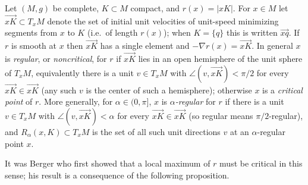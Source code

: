 \begin{definition}
  \label{def:pet-ch12-alpha-regular}
  Let $(M,g)$ be complete, $K\subset M$ compact, and $r(x)=|xK|$. For
  $x\in M$ let $\overrightarrow{xK}\subset T_xM$ denote the set of initial
  unit velocities of unit-speed minimizing segments from $x$ to $K$ (i.e.\ of
  length $r(x)$); when $K=\{q\}$ this is written $\overrightarrow{xq}$. If $r$
  is smooth at $x$ then $\overrightarrow{xK}$ has a single element and
  $-\nabla r(x)=\overrightarrow{xK}$. In general $x$ is \emph{regular}, or
  \emph{noncritical}, for $r$ if $\overrightarrow{xK}$ lies in an open
  hemisphere of the unit sphere of $T_xM$, equivalently there is a unit
  $v\in T_xM$ with $\angle(v,\overrightarrow{xK})<\pi/2$ for every
  $\overrightarrow{xK}\in\overrightarrow{xK}$ (any such $v$ is the center of
  such a hemisphere); otherwise $x$ is a \emph{critical point} of $r$. More
  generally, for $\alpha\in(0,\pi]$, $x$ is \emph{$\alpha$-regular} for $r$ if
  there is a unit $v\in T_xM$ with $\angle(v,\overrightarrow{xK})<\alpha$ for
  every $\overrightarrow{xK}\in\overrightarrow{xK}$ (so regular means
  $\pi/2$-regular), and $R_\alpha(x,K)\subset T_xM$ is the set of all such
  unit directions $v$ at an $\alpha$-regular point $x$.
\end{definition}

It was Berger who first showed that a local maximum of $r$ must be critical
in this sense; his result is a consequence of the following proposition.

